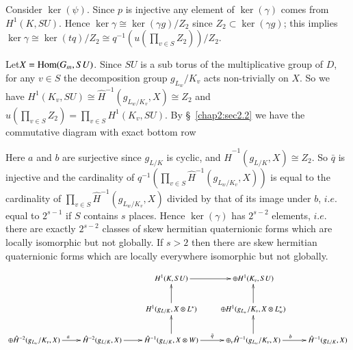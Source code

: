 Consider $\ker(\psi)$. Since $p$ is injective any element of
$\ker(\gamma)$ comes from $H^1(K,SU)$. Hence $\ker \gamma \cong
\ker(\gamma g ) / Z_2$ since $Z_2 \subset \ker (\gamma g)$; this
implies $\ker\gamma \cong \ker(tq)/Z_2 \cong q^{-1}(u(\prod\limits_{v
  \in S} Z_2))/Z_2$.  

Let\pageoriginale $X= \operatorname{Hom} (G_m,SU)$. Since $SU$ is a sub torus of the 
multiplicative group of $D$, for any $v \in S$ the decomposition group
$g_{L_w}/K_v$ acts non-trivially on $X$. So we have $H^1(K_v,SU)
\cong \hat {H}^{-1}(g_{L_{w}/K_{v}},X)\cong Z_2$ and
$u(\prod\limits_{v \in S} Z_2) = \prod\limits_{v \in
  S}H^1(K_v,SU)$. By \S~\ref{chap2:sec2.2} 
we have the commutative diagram with exact bottom row 


Here $a$ and $b$ are surjective since $g_{L/K}$ is cyclic, and $\hat
{H}^{-1}(g_{L/K},X) \cong Z_2$. So $\bar{q}$ is injective and the
cardinality of $q^{-1}(\prod\limits_{v \in
  S}\hat{H}^{-1}(g_{L_{w}/K_{v}},X))$ is equal to the cardinality of
$\prod\limits_{v \in S}\hat{H}^{-1}(g_{L_{w}/K_{v}},X)$ divided by
that of its image under $b$, $i.e$. equal to $2^{s-1}$ if $S$ contains
$s$ places. Hence $\ker(\gamma)$ has $2^{s-2}$ elements, $i.e$. there
are exactly $2^{s-2}$ classes of skew hermitian quaternionic forms
which are locally isomorphic but not globally. If $s>2$ then there are
skew hermitian quaternionic forms which are locally everywhere
isomorphic but not globally. 
\newpage

\begin{landscape}
\[
\xymatrix{
& & H^1 (K, SU) \ar[r]  & \oplus H^1 (K_v, SU) & \\
& & H^1 (g_{L/K}, X \otimes L^\ast) \ar[u] &  \oplus H^1 (g_{L_w}/
  K_v, X \otimes L^\ast_w) \ar[u]\\
\oplus \hat{H}^{-2} (g_{L_w}/ K_v, X) \ar[r]^a & \hat{H}^{-2}
(g_{L/K},X) \ar[r] & \hat{H}^{-1} (g_{L/K}, X \otimes W)
\ar[r]^{\bar{q}} \ar[u] & \oplus_v \hat{H}^{-1} (g_{L_w}/ K_v, X)
\ar[r]^b\ar[u] & \hat{H}^{-1} (g_{L/K}, X) 
}
\]
\end{landscape}
